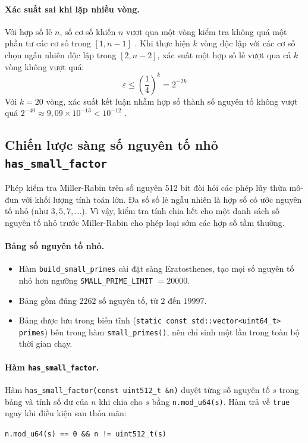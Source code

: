 \paragraph{Xác suất sai khi lặp nhiều vòng.} Với hợp số lẻ $n$, số cơ số khiến $n$ vượt qua một vòng kiểm tra không quá một phần tư các cơ số trong $[1, n - 1]$ \cite{rabin1980}. Khi thực hiện $k$ vòng độc lập với các cơ số chọn ngẫu nhiên độc lập trong $[2, n - 2]$, xác suất một hợp số lẻ vượt qua cả $k$ vòng không vượt quá:
\begin{equation}
\varepsilon \le \left(\frac{1}{4}\right)^k = 2^{-2k}
\end{equation}
Với $k = 20$ vòng, xác suất kết luận nhầm hợp số thành số nguyên tố không vượt quá $2^{-40} \approx 9{,}09 \times 10^{-13} < 10^{-12}$ \cite{menezes1996handbook}.

\subsection{Chiến lược sàng số nguyên tố nhỏ \texttt{has\_small\_factor}}

Phép kiểm tra Miller-Rabin trên số nguyên 512 bit đòi hỏi các phép lũy thừa mô-đun với khối lượng tính toán lớn. Đa số số lẻ ngẫu nhiên là hợp số có ước nguyên tố nhỏ (như $3, 5, 7, \dots$). Vì vậy, kiểm tra tính chia hết cho một danh sách số nguyên tố nhỏ trước Miller-Rabin cho phép loại sớm các hợp số tầm thường.

\paragraph{Bảng số nguyên tố nhỏ.}
\begin{itemize}
  \item Hàm \texttt{build\_\allowbreak{}small\_\allowbreak{}primes} cài đặt sàng Eratosthenes, tạo mọi số nguyên tố nhỏ hơn ngưỡng \texttt{SMALL\_\allowbreak{}PRIME\_\allowbreak{}LIMIT} $= 20000$.
  \item Bảng gồm đúng $2262$ số nguyên tố, từ $2$ đến $19997$.
  \item Bảng được lưu trong biến tĩnh (\texttt{static const std::vector<uint64\_t> primes}) bên trong hàm \texttt{small\_primes()}, nên chỉ sinh một lần trong toàn bộ thời gian chạy.
\end{itemize}

\paragraph{Hàm \texttt{has\_small\_factor}.}
Hàm \texttt{has\_small\_factor(const uint512\_t \&n)} duyệt từng số nguyên tố $s$ trong bảng và tính số dư của $n$ khi chia cho $s$ bằng \texttt{n.mod\_u64(s)}. Hàm trả về \texttt{true} ngay khi điều kiện sau thỏa mãn:
\begin{center}
\texttt{n.mod\_u64(s) == 0 \&\& n != uint512\_t(s)}
\end{center}

